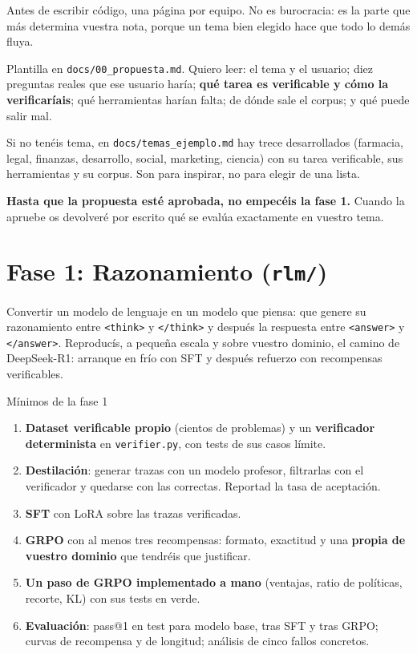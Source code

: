 \documentclass[11pt,a4paper]{article}
\newcommand{\code}[1]{{\small\texttt{#1}}}
\newcommand{\file}[1]{{\small\texttt{\textcolor{arcablue}{#1}}}}
\begin{document}
Antes de escribir código, una página por equipo. No es burocracia: es la parte que más
determina vuestra nota, porque un tema bien elegido hace que todo lo demás fluya.

Plantilla en \file{docs/00\_propuesta.md}. Quiero leer: el tema y el usuario; diez preguntas
reales que ese usuario haría; \textbf{qué tarea es verificable y cómo la verificaríais};
qué herramientas harían falta; de dónde sale el corpus; y qué puede salir mal.

Si no tenéis tema, en \file{docs/temas\_ejemplo.md} hay trece desarrollados (farmacia, legal,
finanzas, desarrollo, social, marketing, ciencia) con su tarea verificable, sus herramientas
y su corpus. Son para inspirar, no para elegir de una lista.

\textbf{Hasta que la propuesta esté aprobada, no empecéis la fase 1.} Cuando la apruebe os
devolveré por escrito qué se evalúa exactamente en vuestro tema.

\section{Fase 1: Razonamiento (\file{rlm/})}

Convertir un modelo de lenguaje en un modelo que piensa: que genere su razonamiento entre
\code{<think>} y \code{</think>} y después la respuesta entre \code{<answer>} y
\code{</answer>}. Reproducís, a pequeña escala y sobre vuestro dominio, el camino de
DeepSeek-R1: arranque en frío con SFT y después refuerzo con recompensas verificables.

\begin{minimos}{Mínimos de la fase 1}
\begin{enumerate}
  \item \textbf{Dataset verificable propio} (cientos de problemas) y un \textbf{verificador
  determinista} en \file{verifier.py}, con tests de sus casos límite.
  \item \textbf{Destilación}: generar trazas con un modelo profesor, filtrarlas con el
  verificador y quedarse con las correctas. Reportad la tasa de aceptación.
  \item \textbf{SFT} con LoRA sobre las trazas verificadas.
  \item \textbf{GRPO} con al menos tres recompensas: formato, exactitud y una
  \textbf{propia de vuestro dominio} que tendréis que justificar.
  \item \textbf{Un paso de GRPO implementado a mano} (ventajas, ratio de políticas, recorte,
  KL) con sus tests en verde.
  \item \textbf{Evaluación}: pass@1 en test para modelo base, tras SFT y tras GRPO; curvas de
  recompensa y de longitud; análisis de cinco fallos concretos.
\end{enumerate}
\end{minimos}
\end{document}
